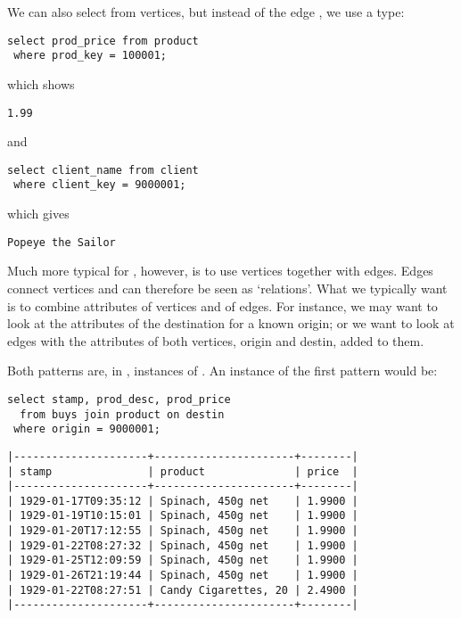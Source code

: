 We can also select from vertices,
but instead of the edge ,
we use a type:

\begin{sqlcode}
\begin{lstlisting}
select prod_price from product
 where prod_key = 100001;
\end{lstlisting}
\end{sqlcode}

which shows
\begin{verbatim}
1.99
\end{verbatim}

and

\begin{sqlcode}
\begin{lstlisting}
select client_name from client
 where client_key = 9000001;
\end{lstlisting}
\end{sqlcode}

which gives
\begin{verbatim}
Popeye the Sailor
\end{verbatim}

Much more typical for \nowdb, however,
is to use vertices together with edges. Edges connect vertices
and can therefore be seen as `relations'.
What we typically want is to combine attributes
of vertices and of edges.
For instance, we may want to look at the attributes
of the destination for a known origin;
or we want to look at edges with the attributes
of both vertices, origin and destin, added to them.

Both patterns are, in \sql, instances of .
An instance of the first pattern would be:

\begin{sqlcode}
\begin{lstlisting}
select stamp, prod_desc, prod_price
  from buys join product on destin
 where origin = 9000001;
\end{lstlisting}
\end{sqlcode}

\begin{minipage}{\textwidth}
\begin{verbatim}
|---------------------+----------------------+--------|
| stamp               | product              | price  |
|---------------------+----------------------+--------|
| 1929-01-17T09:35:12 | Spinach, 450g net    | 1.9900 |
| 1929-01-19T10:15:01 | Spinach, 450g net    | 1.9900 |
| 1929-01-20T17:12:55 | Spinach, 450g net    | 1.9900 |
| 1929-01-22T08:27:32 | Spinach, 450g net    | 1.9900 |
| 1929-01-25T12:09:59 | Spinach, 450g net    | 1.9900 |
| 1929-01-26T21:19:44 | Spinach, 450g net    | 1.9900 |
| 1929-01-22T08:27:51 | Candy Cigarettes, 20 | 2.4900 |
|---------------------+----------------------+--------|
\end{verbatim}
\end{minipage}

